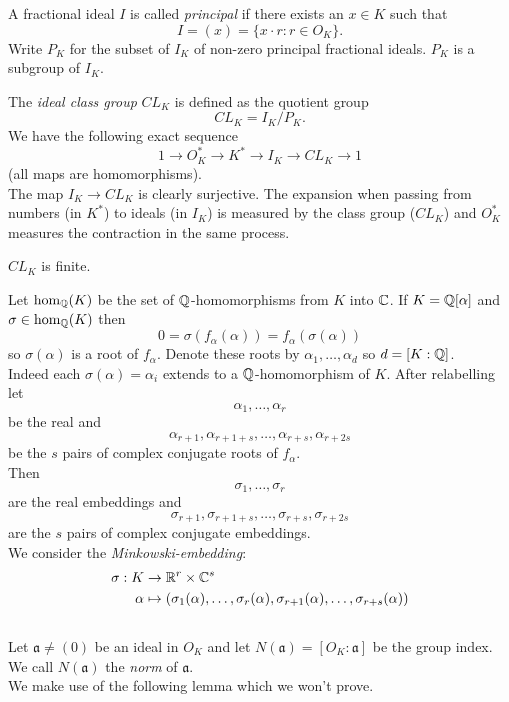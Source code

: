 \documentclass[NumTh.tex]{subfiles}
\begin{document}
A fractional ideal $I$ is called \emph{principal} if there exists an $x \in K$ such that 
\[ I = (x) = \{ x \cdot r: r \in O_K \} \text{.} \]
Write $P_K$ for the subset of $I_K$ of non-zero principal fractional ideals.
$P_K$ is a subgroup of $I_K$.

The \emph{ideal class group} $CL_K$ is defined as the quotient group
\[ CL_K = I_K/P_K \text{.} \]
We have the following exact sequence
\[ 1 \to O_K^\ast \to K^\ast \to I_K \to CL_K \to 1 \]
(all maps are homomorphisms).\\
The map $I_K \to CL_K$ is clearly surjective.
The expansion when passing from numbers (in $K^\ast$) to ideals (in $I_K$) is measured by the class group ($CL_K$)
and $O_K^\ast$ measures the contraction in the same process.

\begin{theorem}\label{th_3_4_3}
  $CL_K$ is finite.
\end{theorem}

Let $\hom_{\mathbb{Q}}(K)$ be the set of $\mathbb{Q}$-homomorphisms from $K$ into $\mathbb{C}$.
If $K = \mathbb{Q}[\alpha]$ and $\sigma \in \hom_{\mathbb{Q}}(K)$ then
\[ 0 = \sigma(f_\alpha(\alpha)) = f_\alpha(\sigma ( \alpha)) \]
so $\sigma(\alpha)$ is a root of $f_\alpha$.
Denote these roots by $\alpha_1,\dots,\alpha_d$ so $d = [K:\mathbb{Q}]$.\\
Indeed each $\sigma(\alpha) = \alpha_i$ extends to a $\mathbb{Q}$-homomorphism of $K$.
After relabelling let 
\[ \alpha_1,\dots,\alpha_r \] 
be the real and
\[ \alpha_{r+1},\alpha_{r+1+s},\dots,\alpha_{r+s},\alpha_{r + 2s} \] 
be the $s$ pairs of complex conjugate roots of $f_\alpha$.\\
Then
\[ \sigma_1,\dots,\sigma_r \]
are the real embeddings and
\[ \sigma_{r+1},\sigma_{r+1+s},\dots,\sigma_{r+s},\sigma_{r+2s} \]
are the $s$ pairs of complex conjugate embeddings.\\
We consider the \emph{Minkowski-embedding}:
\begin{align*}
  \sigma: K &\to \mathbb{R}^r \times \mathbb{C}^s \\
  \alpha &\mapsto (\sigma_1(\alpha),\dots,\sigma_r(\alpha),\sigma_{r+1}(\alpha),\dots,\sigma_{r+s}(\alpha))
\end{align*}
\\

Let $\mathfrak{a} \neq (0)$ be an ideal in $O_K$ and let $N(\mathfrak{a}) = [O_K:\mathfrak{a}]$ be the group index.
We call $N(\mathfrak{a})$ the \emph{norm} of $\mathfrak{a}$.
\\

We make use of the following lemma which we won't prove.
\end{document}
